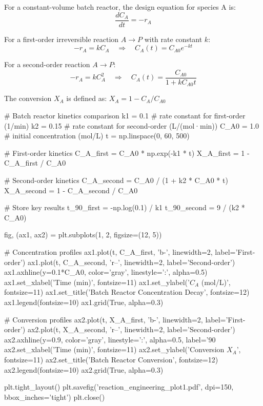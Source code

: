 \documentclass[11pt,a4paper]{article}
\begin{document}
For a constant-volume batch reactor, the design equation for species A is:
\begin{equation}
\frac{dC_A}{dt} = -r_A
\end{equation}

For a first-order irreversible reaction $A \rightarrow P$ with rate constant $k$:
\begin{equation}
-r_A = k C_A \quad \Rightarrow \quad C_A(t) = C_{A0} e^{-kt}
\end{equation}

For a second-order reaction $A \rightarrow P$:
\begin{equation}
-r_A = k C_A^2 \quad \Rightarrow \quad C_A(t) = \frac{C_{A0}}{1 + k C_{A0} t}
\end{equation}

The conversion $X_A$ is defined as: $X_A = 1 - C_A/C_{A0}$

\begin{pycode}
# Batch reactor kinetics comparison
k1 = 0.1  # rate constant for first-order (1/min)
k2 = 0.15  # rate constant for second-order (L/(mol·min))
C_A0 = 1.0  # initial concentration (mol/L)
t = np.linspace(0, 60, 500)

# First-order kinetics
C_A_first = C_A0 * np.exp(-k1 * t)
X_A_first = 1 - C_A_first / C_A0

# Second-order kinetics
C_A_second = C_A0 / (1 + k2 * C_A0 * t)
X_A_second = 1 - C_A_second / C_A0

# Store key results
t_90_first = -np.log(0.1) / k1
t_90_second = 9 / (k2 * C_A0)

fig, (ax1, ax2) = plt.subplots(1, 2, figsize=(12, 5))

# Concentration profiles
ax1.plot(t, C_A_first, 'b-', linewidth=2, label='First-order')
ax1.plot(t, C_A_second, 'r--', linewidth=2, label='Second-order')
ax1.axhline(y=0.1*C_A0, color='gray', linestyle=':', alpha=0.5)
ax1.set_xlabel('Time (min)', fontsize=11)
ax1.set_ylabel('$C_A$ (mol/L)', fontsize=11)
ax1.set_title('Batch Reactor Concentration Decay', fontsize=12)
ax1.legend(fontsize=10)
ax1.grid(True, alpha=0.3)

# Conversion profiles
ax2.plot(t, X_A_first, 'b-', linewidth=2, label='First-order')
ax2.plot(t, X_A_second, 'r--', linewidth=2, label='Second-order')
ax2.axhline(y=0.9, color='gray', linestyle=':', alpha=0.5, label='90\\%
ax2.set_xlabel('Time (min)', fontsize=11)
ax2.set_ylabel('Conversion $X_A$', fontsize=11)
ax2.set_title('Batch Reactor Conversion', fontsize=12)
ax2.legend(fontsize=10)
ax2.grid(True, alpha=0.3)

plt.tight_layout()
plt.savefig('reaction_engineering_plot1.pdf', dpi=150, bbox_inches='tight')
plt.close()
\end{pycode}
\end{document}
